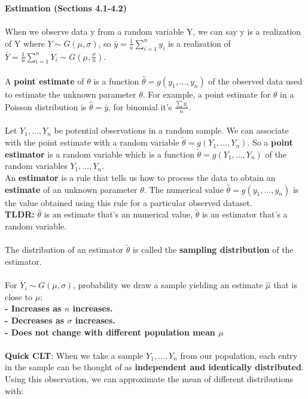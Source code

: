 \documentclass[a4paper,12pt]{article}
\begin{document}
\textbf{Estimation (Sections 4.1-4.2)}
\\
\\ When we observe data y from a random variable Y, we can say
y is a realization of Y where $Y \sim G (\mu, \sigma)$, so $\bar{y} = \frac{1}{n} \sum^{n}_{i=1} y_i$ is a realisation of $\bar{Y} = \frac{1}{n} \sum^{n}_{i=1} Y_i \sim G (\mu, \frac{\sigma}{n})$.
\\
\\ A \textbf{point estimate} of $\theta$ is a function $\hat{\theta} = g (y_1, ..., y_n) $ of the observed data used to estimate the unknown parameter $\theta$. For example, a point estimate for 
$\theta$ in a Poisson distribution is $\hat{\theta} = \bar{y}$, for binomial it's $\frac{\sum{y_i}}{n}$.
\\
\\ Let $Y_1, ..., Y_n$ be potential observations in a random sample. We can associate with the point estimate with
a random variable $\tilde{\theta} =  g (Y_1, ..., Y_n)$. So a \textbf{point estimator} is a random variable which is a
function $\tilde{\theta} =  g (Y_1, ..., Y_n)$
of the random variables $Y_1, ..., Y_n$. 
\\An \textbf{estimator} is a rule that tells us how to process the data to obtain an \textbf{estimate} of an unknown parameter $\theta$.
The numerical value $\hat{\theta} = g (y_1, ..., y_n) $ is the value obtained using this rule for a particular observed dataset.
\\ \textbf{TLDR:} $\hat{\theta}$ is an estimate that's an numerical value, $\tilde{\theta}$ is an estimator that's a random variable.
\\
\\The distribution of an estimator $\tilde{\theta}$ is called the \textbf{sampling distribution} of the estimator. 
\\
\\For $Y_i \sim G (\mu, \sigma)$, probability we draw a sample yielding an estimate $\hat{\mu}$ that is close to $\mu$:
\textbf{\\- Increases as $n$ increases.
\\- Decreases as $\sigma$ increases.
\\- Does not change with  different population mean $\mu$}
\\
\\ \textbf{Quick CLT}: When we take a sample $Y_1, \ldots, Y_n$ from our population, each entry in the sample can be thought of as \textbf{independent and identically distributed}. Using this observation, we can approximate the mean of different distributions with:
\end{document}
